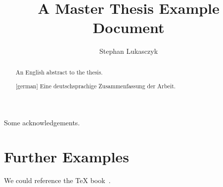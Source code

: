 \documentclass[%
  twoside=true,%
  logofile={logo.png},%
  thesistype=master,%
  biblatex=true,%
  UKenglish,%
]{se2thesis}
\author{Stephan Lukasczyk}
\title{A Master Thesis Example Document}
\institute{Chair of Example}
\begin{document}
\frontmatter

\maketitle

\authorshipDeclaration

\begin{abstract}
  An English abstract to the thesis.
\end{abstract}

\begin{abstract}[german]
  Eine deutschsprachige Zusammenfassung der Arbeit.
\end{abstract}

\begin{acknowledgements}
  Some acknowledgements.
\end{acknowledgements}

\tableofcontents

\mainmatter

\blinddocument

\section{Further Examples}

We could reference the \TeX{} book~\cite{Knu86}.

\backmatter

\printbibliography
\end{document}
